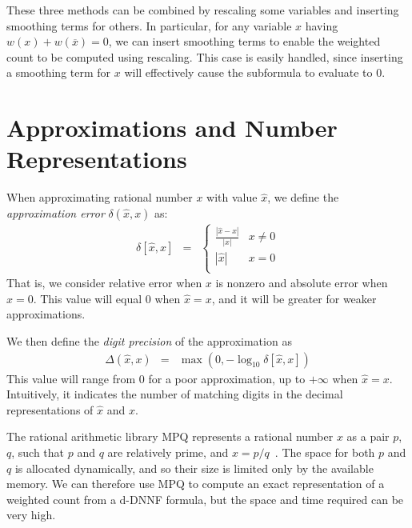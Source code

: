\documentclass[letterpaper,USenglish,cleveref, autoref, thm-restate]{lipics-v2021}
\newcommand{\obar}[1]{\overline{#1}}
\newcommand{\approximate}[1]{\hat{#1}}
\newcommand{\approxx}{\approximate{x}}
\newcommand{\aerror}{\delta}
\newcommand{\digitprecision}{\Delta}
\begin{document}
  These three methods can be combined by rescaling some variables and
  inserting smoothing terms for others.  In particular, for any
  variable $x$ having $w(x) + w(\obar{x}) = 0$, we can insert smoothing terms to enable the weighted count to be computed using rescaling.
This case is easily handled, since
inserting a smoothing term for $x$
  will effectively cause the subformula to evaluate to $0$.

\section{Approximations and Number Representations}
\label{sect:background:numbers}

When approximating rational number $x$ with value $\approximate{x}$, we
define the \emph{approximation error} $\aerror(\approxx, x)$ as:
\begin{eqnarray}
\aerror[\approxx, x] & = & \left\{ \begin{array}{ll}
  \frac{|\approxx - x|}{|x|}  & x \not = 0\\[0.8em]
  |\approxx| & x = 0\\
  \end{array} \right. \label{eqn:approx:error}
\end{eqnarray}
That is, we consider relative error when $x$ is nonzero and absolute error when $x=0$.
This value will equal 0 when $\approxx=x$, and it will be greater for weaker approximations.

We then define the \emph{digit precision} of the approximation as
\begin{eqnarray}
\digitprecision(\approxx, x) & = & \max(0, -\log_{10} \aerror[\approxx, x]) \label{eqn:digitprecision} 
\end{eqnarray}
This value will range from $0$ for a poor approximation, up to $+\infty$ when $\approxx=x$.
Intuitively, it indicates the number of matching digits in the decimal representations of $\approxx$ and $x$.

The rational arithmetic library MPQ represents a rational number $x$
as a pair $p$, $q$, such that $p$ and $q$ are relatively prime, and $x = p/q$~\cite{knuth:rational:1981}.
The space for both $p$ and $q$ is allocated dynamically, and
so their size is limited only by the available memory.  We can
therefore use MPQ to compute an exact representation of a weighted
count from a d-DNNF formula, but the space and time required can be very high.
\end{document}
